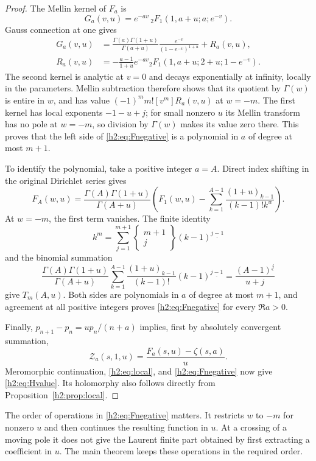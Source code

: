 \documentclass[11pt,a4paper]{article}
\theoremstyle{definition}
\theoremstyle{remark}
\numberwithin{equation}{section}
\begin{document}
\begin{proof}
The Mellin kernel of $F_a$ is
\[
 G_a(v,u)=e^{-av}\,{}_2F_1(1,a+u;a;e^{-v}).
\]
Gauss connection at one gives
\begin{align*}
 G_a(v,u)&=\frac{\Gamma(a)\Gamma(1+u)}{\Gamma(a+u)}
       \frac{e^{-v}}{(1-e^{-v})^{1+u}}+R_a(v,u),\\
 R_a(v,u)&=-\frac{a-1}{1+u}e^{-av}
      {}_2F_1(1,a+u;2+u;1-e^{-v}).
\end{align*}
The second kernel is analytic at $v=0$ and decays exponentially at
infinity, locally in the parameters. Mellin subtraction therefore
shows that its quotient by $\Gamma(w)$ is entire in $w$, and has value
$(-1)^m m![v^m]R_a(v,u)$ at $w=-m$. The first kernel has local
exponents $-1-u+j$; for small nonzero $u$ its Mellin transform has no
pole at $w=-m$, so division by $\Gamma(w)$ makes its value zero there.
This proves that the left side of \eqref{h2:eq:Fnegative} is a
polynomial in $a$ of degree at most $m+1$.

To identify the polynomial, take a positive integer $a=A$. Direct
index shifting in the original Dirichlet series gives
\[
 F_A(w,u)=\frac{\Gamma(A)\Gamma(1+u)}{\Gamma(A+u)}
 \left(F_1(w,u)-\sum_{k=1}^{A-1}
       \frac{(1+u)_{k-1}}{(k-1)!k^w}\right).
\]
At $w=-m$, the first term vanishes. The finite identity
\[
 k^m=\sum_{j=1}^{m+1}
    \left\{\begin{matrix}m+1\\j\end{matrix}\right\}
                           (k-1)^{\underline{j-1}}
\]
and the binomial summation
\[
 \frac{\Gamma(A)\Gamma(1+u)}{\Gamma(A+u)}
 \sum_{k=1}^{A-1}\frac{(1+u)_{k-1}}{(k-1)!}
           (k-1)^{\underline{j-1}}
       =\frac{(A-1)^{\underline j}}{u+j}
\]
give $T_m(A,u)$. Both sides are polynomials in $a$ of degree at most
$m+1$, and agreement at all positive integers proves
\eqref{h2:eq:Fnegative} for every $\Re a>0$.

Finally, $p_{n+1}-p_n=up_n/(n+a)$ implies, first by absolutely
convergent summation,
\begin{equation}\label{h2:eq:telescoping}
 \mathcal Z_a(s,1,u)=\frac{F_a(s,u)-\zeta(s,a)}u.
\end{equation}
Meromorphic continuation, \eqref{h2:eq:local}, and
\eqref{h2:eq:Fnegative} now give \eqref{h2:eq:Hvalue}. Its
holomorphy also follows directly from Proposition~\ref{h2:prop:local}.
\end{proof}

The order of operations in \eqref{h2:eq:Fnegative} matters. It restricts
$w$ to $-m$ for nonzero $u$ and then continues the resulting function in
$u$. At a crossing of a moving pole it does not give the Laurent finite
part obtained by first extracting a coefficient in $u$. The main
theorem keeps these operations in the required order.
\end{document}
